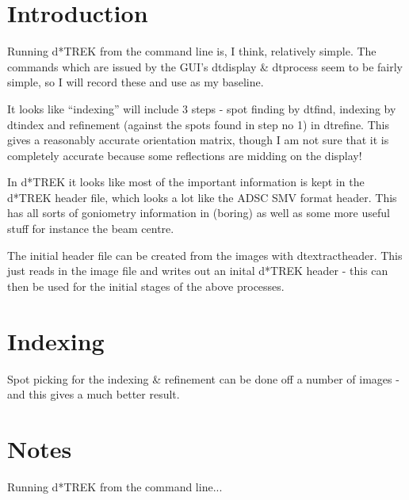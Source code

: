 \documentclass[a4paper, 11pt]{article}
\begin{document}
\section{Introduction}

Running d*TREK from the command line is, I think, relatively simple. The 
commands which are issued by the GUI's dtdisplay \& dtprocess seem to be
fairly simple, so I will record these and use as my baseline.

It looks like ``indexing'' will include 3 steps - spot finding by dtfind,
indexing by dtindex and refinement (against the spots found in step no 1)
in dtrefine. This gives a reasonably accurate orientation matrix, though I 
am not sure that it is completely accurate because some reflections are
midding on the display!

In d*TREK it looks like most of the important information is kept in the 
d*TREK header file, which looks a lot like the ADSC SMV format header. This
has all sorts of goniometry information in (boring) as well as some more
useful stuff for instance the beam centre.

The initial header file can be created from the images with dtextractheader.
This just reads in the image file and writes out an inital d*TREK header - 
this can then be used for the initial stages of the above processes.

\section{Indexing}

Spot picking for the indexing \& refinement can be done off a number of 
images - and this gives a much better result.


\section{Notes}

Running d*TREK from the command line...
\end{document}
